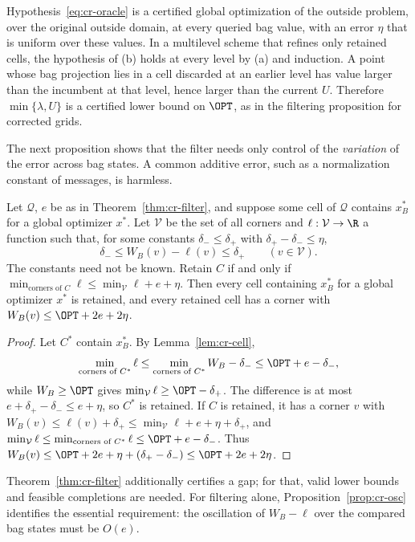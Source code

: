 \begin{remark}
Hypothesis~\eqref{eq:cr-oracle} is a certified global optimization of the
outside problem, over the original outside domain, at every queried bag
value, with an error $\eta$ that is uniform over these values. In a
multilevel scheme that refines only retained cells, the hypothesis of
(b) holds at every level by (a) and induction. A point whose bag
projection lies in a cell discarded at an earlier level has value larger
than the incumbent at that level, hence larger than the current $U$.
Therefore $\min\{\lambda,U\}$ is a certified lower bound on $\OPT$, as in
the filtering proposition for corrected grids.
\end{remark}

The next proposition shows that the filter needs only control of the
\emph{variation} of the error across bag states. A common additive error,
such as a normalization constant of messages, is harmless.

\begin{proposition}\label{prop:cr-osc}
Let $\mathcal Q$, $e$ be as in Theorem~\ref{thm:cr-filter}, and suppose
some cell of $\mathcal Q$ contains $x^*_B$ for a global optimizer $x^*$.
Let $\mathcal V$ be the set of all corners and $\ell:\mathcal V\to\R$ a
function such that, for some constants $\delta_-\le\delta_+$ with
$\delta_+-\delta_-\le\eta$,
\[
\delta_-\le W_B(v)-\ell(v)\le\delta_+\qquad(v\in\mathcal V).
\]
The constants need not be known. Retain $C$ if and only if
$\min_{\text{corners of }C}\ell\le\min_{\mathcal V}\ell+e+\eta$. Then every
cell containing $x^*_B$ for a global optimizer $x^*$ is retained, and
every retained cell has a corner with $W_B(v)\le\OPT+2e+2\eta$.
\end{proposition}
\begin{proof}
Let $C^*$ contain $x^*_B$. By Lemma~\ref{lem:cr-cell},
\[
\min_{\text{corners of }C^*}\ell\le\min_{\text{corners of }C^*}W_B-\delta_-
\le\OPT+e-\delta_-,
\]
while $W_B\ge\OPT$ gives
$\min_{\mathcal V}\ell\ge\OPT-\delta_+$. The difference is at most
$e+\delta_+-\delta_-\le e+\eta$, so $C^*$ is retained. If $C$ is retained,
it has a corner $v$ with
$W_B(v)\le\ell(v)+\delta_+\le\min_{\mathcal V}\ell+e+\eta+\delta_+$, and
$\min_{\mathcal V}\ell\le\min_{\text{corners of }C^*}\ell\le\OPT+e-\delta_-$.
Thus $W_B(v)\le\OPT+2e+\eta+(\delta_+-\delta_-)\le\OPT+2e+2\eta$.
\end{proof}

Theorem~\ref{thm:cr-filter} additionally certifies a gap; for that, valid
lower bounds and feasible completions are needed. For filtering alone,
Proposition~\ref{prop:cr-osc} identifies the essential requirement: the
oscillation of $W_B-\ell$ over the compared bag states must be
$O(e)$.

